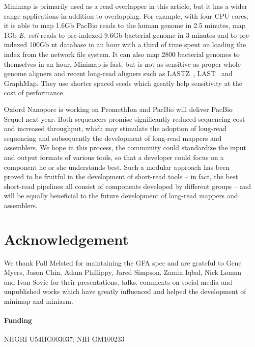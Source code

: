 \documentclass{bioinfo}
\begin{document}
Minimap is primarily used as a read overlapper in this article, but it has a
wider range applications in addition to overlapping.  For example, with four
CPU cores, it is able to map 1.6Gb PacBio reads to the human genome in 2.5
minutes, map 1Gb {\it E. coli} reads to pre-indexed 9.6Gb bacterial genome in 3
minutes and to pre-indexed 100Gb nt database in an hour with a third of time
spent on loading the index from the network file system. It can also map 2800
bacterial genomes to themselves in an hour. Minimap is fast, but is not as
sensitive as proper whole-genome aligners and recent long-read aligners such as
LASTZ~\citep{harris:2007aa}, LAST~\citep{Kiebasa:2011aa} and GraphMap. They use
shorter spaced seeds which greatly help sensitivity at the cost of performance.

Oxford Nanopore is working on PromethIon and PacBio will deliver PacBio Sequel
next year. Both sequencers promise significantly reduced sequencing cost and
increased throughput, which may stimulate the adoption of long-read sequencing
and subsequently the development of long-read mappers and assemblers. We hope
in this process, the community could standardize the input and output formats
of various tools, so that a developer could focus on a component he or she
understands best. Such a modular approach has been proved to be fruitful in the
development of short-read tools -- in fact, the best short-read pipelines all
consist of components developed by different groups -- and will be equally
beneficial to the future development of long-read mappers and assemblers.

\section*{Acknowledgement}

We thank Pall Melsted for maintaining the GFA spec and are grateful to Gene
Myers, Jason Chin, Adam Phillippy, Jared Simpson, Zamin Iqbal, Nick Loman and
Ivan Sovic for their presentations, talks, comments on social media and
unpublished works which have greatly influenced and helped the development of
minimap and miniasm.

\paragraph{Funding\textcolon} NHGRI U54HG003037; NIH GM100233


\end{document}

